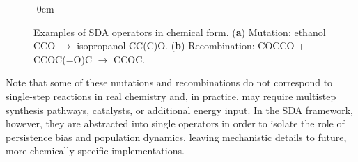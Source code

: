 \documentclass[life,article,submit,pdftex,moreauthors]{Definitions/mdpi}
\begin{document}
\begin{figure}[H]
\begin{adjustwidth}{-\extralength}{0cm}
\centering
{}
\hspace{0.4cm}
\end{adjustwidth}
\caption{Examples of SDA operators in chemical form. (\textbf{a}) Mutation: ethanol CCO $\to$ isopropanol CC(C)O. 
(\textbf{b}) Recombination: COCCO + CCOC(=O)C $\to$ CCOC.}
\label{fig:mutation-recombination}
\end{figure}

Note that some of these mutations and recombinations do not correspond to single-step reactions in real chemistry and, in practice, may require multistep synthesis pathways, catalysts, or additional energy input. In the SDA framework, however, they are abstracted into single operators in order to isolate the role of persistence bias and population dynamics, leaving mechanistic details to future, more chemically specific implementations.
\end{document}
